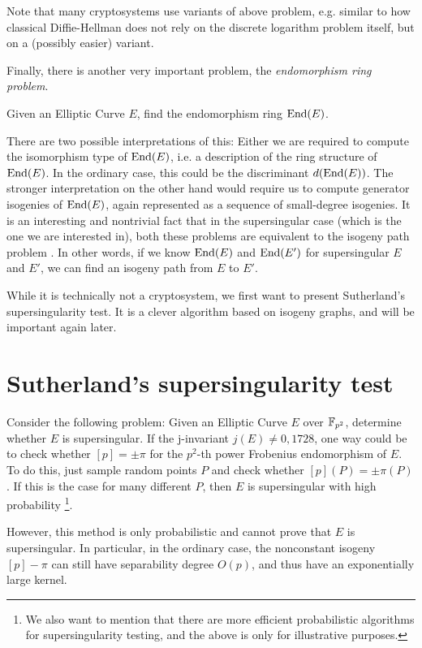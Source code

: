 Note that many cryptosystems use variants of above problem, e.g. similar to how classical Diffie-Hellman does not rely on the discrete logarithm problem itself, but on a (possibly easier) variant.

Finally, there is another very important problem, the \emph{endomorphism ring problem}.
\begin{problem}
    Given an Elliptic Curve $E$, find the endomorphism ring $\mathrm{End}(E)$.
\end{problem}
There are two possible interpretations of this:
Either we are required to compute the isomorphism type of $\mathrm{End}(E)$, i.e. a description of the ring structure of $\mathrm{End}(E)$.
In the ordinary case, this could be the discriminant $d(\mathrm{End}(E))$.
The stronger interpretation on the other hand would require us to compute generator isogenies of $\mathrm{End}(E)$, again represented as a sequence of small-degree isogenies.
It is an interesting and nontrivial fact that in the supersingular case (which is the one we are interested in), both these problems are equivalent to the isogeny path problem \cite{endomorphism_ring_isogeny_path_equivalent}.
In other words, if we know $\mathrm{End}(E)$ and $\mathrm{End}(E')$ for supersingular $E$ and $E'$, we can find an isogeny path from $E$ to $E'$.

While it is technically not a cryptosystem, we first want to present Sutherland's supersingularity test.
It is a clever algorithm based on isogeny graphs, and will be important again later.

\section{Sutherland's supersingularity test}
Consider the following problem: Given an Elliptic Curve $E$ over $\mathbb{F}_{p^2}$, determine whether $E$ is supersingular.
If the j-invariant $j(E) \neq 0, 1728$, one way could be to check whether $[p] = \pm \pi$ for the $p^2$-th power Frobenius endomorphism of $E$.
To do this, just sample random points $P$ and check whether $[p](P) = \pm \pi(P)$.
If this is the case for many different $P$, then $E$ is supersingular with high probability
\footnote{We also want to mention that there are more efficient probabilistic algorithms for supersingularity testing, and the above is only for illustrative purposes.}.

However, this method is only probabilistic and cannot prove that $E$ is supersingular.
In particular, in the ordinary case, the nonconstant isogeny $[p] - \pi$ can still have separability degree $O(p)$, and thus have an exponentially large kernel.


